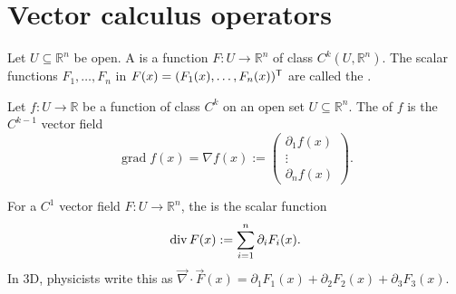 
\section{Vector calculus operators}
\label{sec:vector_calculus_operators}

\begin{definition}
\label{def:vector_field}
Let $U \subseteq \mathbb{R}^n$ be open. A   is a function $F : U \to \mathbb{R}^n$ of class $C^k(U,\mathbb{R}^n)$.
The scalar functions $F_1, \dots, F_n$ in $F(x) = (F_1(x), \dots, F_n(x))^{\mathsf{T}}$ are called the .
\end{definition}

\begin{definition}[Gradient]
\label{def:gradient_vector_field}
Let $f : U \to \mathbb{R}$ be a function of class $C^k$ on an open set $U \subseteq \mathbb{R}^n$. The  of $f$ is the $C^{k-1}$ vector field
\[\operatorname{grad} f(x) = \nabla f(x) := \begin{pmatrix} \partial_1 f(x) \\ \vdots \\ \partial_n f(x) \end{pmatrix}.\]
\end{definition}

\begin{definition}[Divergence]
\label{def:divergence}
For a $C^1$ vector field $F : U \to \mathbb{R}^n$, the  is the scalar function
\[\operatorname{div} F(x) := \sum_{i=1}^n \partial_i F_i(x).\]
In 3D, physicists write this as $\vec{\nabla} \cdot \vec{F}(x) = \partial_1 F_1(x) + \partial_2 F_2(x) + \partial_3 F_3(x)$.
\end{definition}

